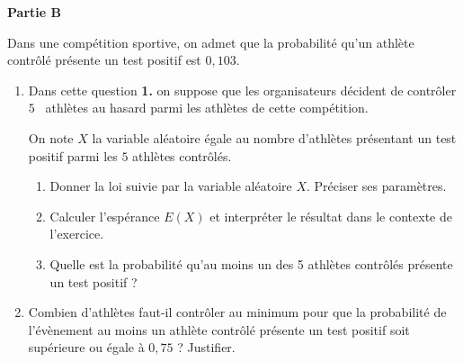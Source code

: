 \bigskip

\textbf{Partie B}

\medskip

Dans une compétition sportive, on admet que la probabilité qu'un athlète contrôlé présente un test positif est $0,103$.

\medskip

\begin{enumerate}
\item Dans cette question \textbf{1.} on suppose que les organisateurs décident de contrôler $5$ ~athlètes au hasard parmi les athlètes de cette compétition. 

On note $X$ la variable aléatoire égale au nombre d'athlètes présentant un test positif parmi les $5$ athlètes contrôlés.
	\begin{enumerate}
		\item Donner la loi suivie par la variable aléatoire $X$. Préciser ses paramètres.
		\item Calculer l'espérance $E(X)$ et interpréter le résultat dans le contexte de l'exercice.
		\item Quelle est la probabilité qu'au moins un des 5 athlètes contrôlés présente un test positif ?
	\end{enumerate}
\item Combien d'athlètes faut-il contrôler au minimum pour que la probabilité de l'évènement \og au moins un athlète contrôlé présente un test positif\fg{} soit supérieure ou égale à $0,75$ ? Justifier.
\end{enumerate}
\vspace{0,5cm}
\bigskip

